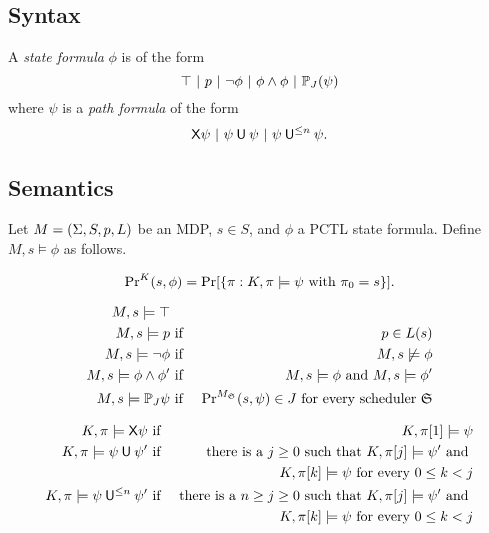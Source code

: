 
\subsection{Syntax}

A \emph{state formula} $\phi$ is of the form
\[
  \top \ |\ 
  p \ |\ 
  \neg \phi \ |\ 
  \phi \wedge \phi \ |\ 
  \PJ{J} (\psi)
\]
where $\psi$ is a \emph{path formula} of the form
\[
  \X \psi \ |\ 
  \psi \until \psi \ |\ 
  \psi \until^{\leq n} \psi.
\]

\subsection{Semantics}

Let $M = (\Act, S, p, L)$ be an MDP, $s \in S$, and $\phi$ a PCTL
state formula. Define $M, s \models \phi$ as follows.

\[
\myPr{s}{K}{\phi} =
\Pr [ \{ \pi : K, \pi \models \psi \textmd{ with } \pi_0 = s \} ].
\]


\begin{eqnarray*}
  M, s \models \top\\
  M, s \models p  & \textmd{ if } &  p \in L(s)\\
  M, s \models \neg \phi  & \textmd{ if } &  M, s \not\models \phi\\
  M, s \models \phi \wedge \phi'
  & \textmd{ if } & M, s \models \phi \textmd{ and }
                    M, s \models \phi'\\
  M, s \models \PJ{J} \psi
  & \textmd{ if } &
  \myPr{s}{M_{\scheduler{S}}}{\psi} \in J
  \textmd{ for every scheduler } \scheduler{S}
\end{eqnarray*}

\begin{eqnarray*}
  K, \pi \models \X \psi
  & \textmd{ if } &
  K, \pi[1] \models \psi\\
  K, \pi \models \psi \until \psi'
  & \textmd{ if } &
  \textmd{there is a } j \geq 0 \textmd{ such that }
  K, \pi[j] \models \psi' \textmd{ and } \\
  & & K, \pi[k] \models \psi
      \textmd{ for every } 0 \leq k < j \\
  K, \pi \models \psi \until^{\leq n} \psi'
  & \textmd{ if } &
  \textmd{there is a } n \geq j \geq 0 \textmd{ such that }
  K, \pi[j] \models \psi' \textmd{ and } \\
  & & K, \pi[k] \models \psi \textmd{ for every } 0 \leq k < j
\end{eqnarray*}


